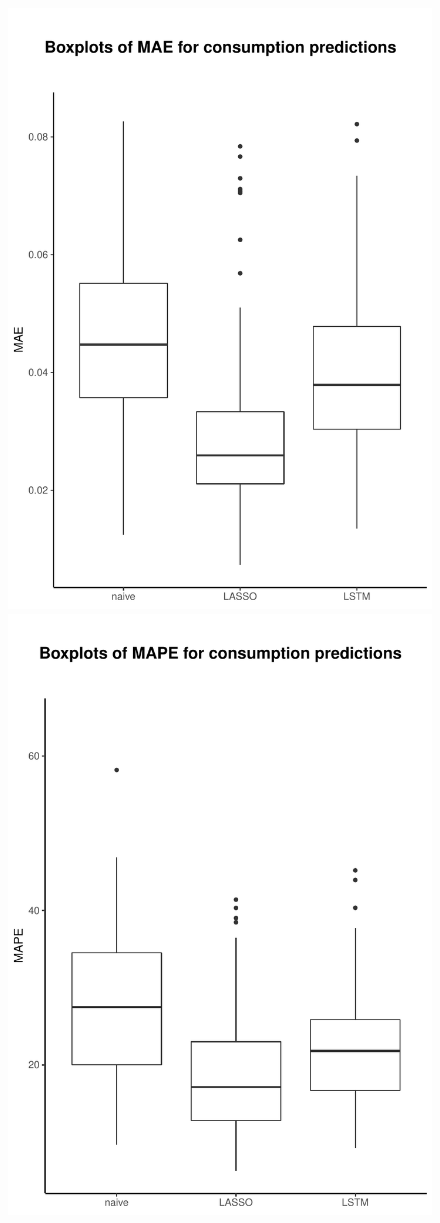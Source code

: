 \begin{figure}
    \centering
    \includegraphics[width=.5\textwidth-5pt]{thesis/graphs/evaluation/c_boxplot_MAE.pdf}
    \includegraphics[width=.5\textwidth-5pt]{thesis/graphs/evaluation/c_boxplot_MAPE.pdf} \\
    

\end{figure}
